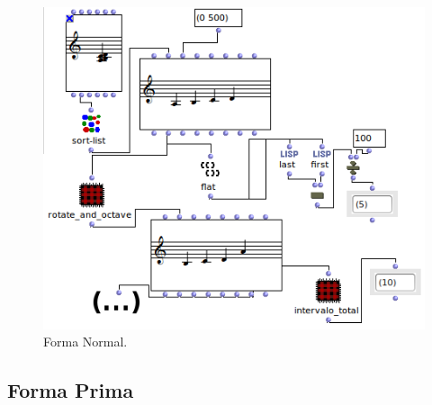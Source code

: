 \documentclass[
	12pt,				%
	openright,			%
	twoside,			%
	a4paper,			%
	english,			%
	french,				%
	spanish,			%
	brazil				%
	]{abntex2}
\begin{document}
\begin{figure}[h]
	\caption{\label{fig_grafico}Forma Normal. }
	\begin{center}
	    \includegraphics[scale=0.7]{OM_settheory/forma_normal.png}
	\end{center}
\end{figure}



\pagebreak
\subsection{Forma Prima} 
\end{document}
